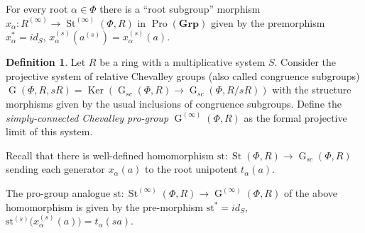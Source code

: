 \documentclass{article}
\theoremstyle{definition}
\newtheorem{df}[lemma]{Definition} \Crefname{df}{Definition}{Definitions}
\theoremstyle{remark}
\DeclareMathOperator\stlin{St}
\DeclareMathOperator\St{St}
\DeclareMathOperator\Ker{Ker}
\DeclareMathOperator\GG{G}
\DeclareMathOperator{\Pro}{Pro}
\newcommand{\Group}{\mathbf{Grp}}
\begin{document}
For every root $\alpha \in \Phi$ there is a ``root subgroup'' morphism $x_{\alpha} \colon R^{(\infty)} \to \St^{(\infty)}(\Phi, R)$ in $\Pro(\Group)$ given by the premorphism $x_\alpha^* = id_S$, $x_\alpha^{(s)}(a^{(s)}) = x_\alpha^{(s)}(a)$.

\begin{df}
 Let $R$ be a ring with a multiplicative system $S$.
 Consider the projective system of relative Chevalley groups (also called congruence subgroups) 
 $\GG(\Phi, R, sR) = \Ker\left(\GG_{sc}(\Phi, R) \to \GG_{sc}(\Phi, R/sR)\right)$ with the structure morphisms given by the usual inclusions of congruence subgroups. Define the {\it simply-connected Chevalley pro-group} $\GG^{(\infty)}(\Phi, R)$ as the formal projective limit of this system.
\end{df}

Recall that there is well-defined homomorphism $\mathrm{st}\colon \St(\Phi, R) \to \GG_{sc}(\Phi, R)$ sending each generator $x_\alpha(a)$ to the root unipotent $t_\alpha(a)$. 

The pro-group analogue \(\mathrm{st} \colon \St^{(\infty)}(\Phi, R) \to \GG^{(\infty)}(\Phi, R)\) of the above homomorphism is given by the pre-morphism \(\mathrm{st}^* = id_S\), \(\mathrm{st}^{(s)}\bigl(x_{\alpha}^{(s)}(a)\bigr) = t_\alpha(sa)\). 
\end{document}
